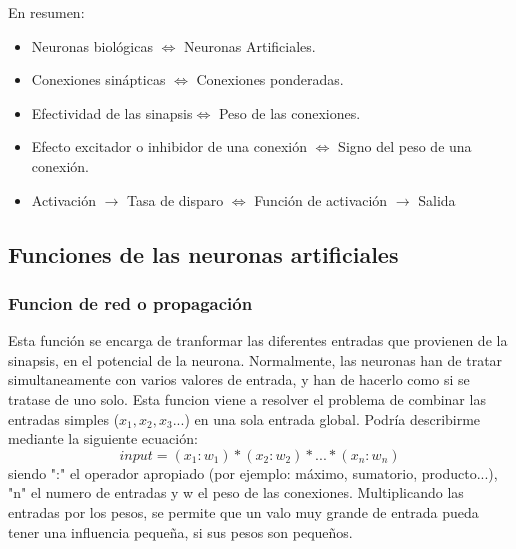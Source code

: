 En resumen:
\begin{itemize}
\item Neuronas biológicas $\Longleftrightarrow$ Neuronas Artificiales.
\item Conexiones sinápticas $\Longleftrightarrow$ Conexiones ponderadas.
\item Efectividad de las sinapsis$\Longleftrightarrow$ Peso de las conexiones.
\item Efecto excitador o inhibidor de una conexión $\Longleftrightarrow$ Signo del peso de una
conexión.
\item Activación $\rightarrow$ Tasa de disparo $\Longleftrightarrow$ Función de activación $\rightarrow$ Salida
\end{itemize}

\subsection {Funciones de las neuronas artificiales}
\subsubsection {Funcion de red o propagación}
Esta función se encarga de tranformar las diferentes entradas que provienen de la sinapsis, en el potencial de la neurona. Normalmente, las neuronas han de tratar simultaneamente con varios valores de entrada, y han de hacerlo como si se tratase de uno solo. Esta funcion viene a resolver el problema de combinar las entradas simples (${x_{1},x_{2},x_{3}...}$) en una sola entrada global. Podría describirme mediante la siguiente ecuación:
\begin{equation}
input = (x_{1}:w_{1})*(x_{2}:w_{2})*...*(x_{n}:w_{n})
\end{equation}
siendo ":" el operador apropiado (por ejemplo: máximo, sumatorio, producto...), "n" el numero de entradas y w el peso de las conexiones. Multiplicando las entradas por los pesos, se permite que un valo muy grande de entrada pueda tener una influencia pequeña, si sus pesos son pequeños.
